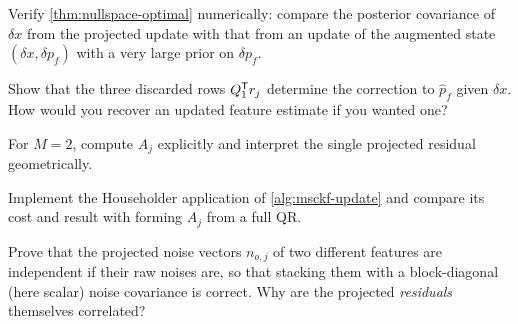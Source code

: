 \begin{exercises}
  \item Verify \cref{thm:nullspace-optimal} numerically: compare the posterior covariance of $\delta x$ from the projected update with
        that from an update of the augmented state $(\delta x, \delta p_f)$ with a very large prior on $\delta p_f$.
  \item Show that the three discarded rows $Q_1^{\mathsf{T}} r_j$ determine the correction to $\hat p_f$ given $\delta x$. How would you recover an
        updated feature estimate if you wanted one?
  \item For $M = 2$, compute $A_j$ explicitly and interpret the single projected residual geometrically.
  \item Implement the Householder application of \cref{alg:msckf-update} and compare its cost and result with forming $A_j$ from a full QR.
  \item Prove that the projected noise vectors $n_{o,j}$ of two different features are independent if their raw noises are,
        so that stacking them with a block-diagonal (here scalar) noise covariance is correct. Why are the projected
        \emph{residuals} themselves correlated?
\end{exercises}

